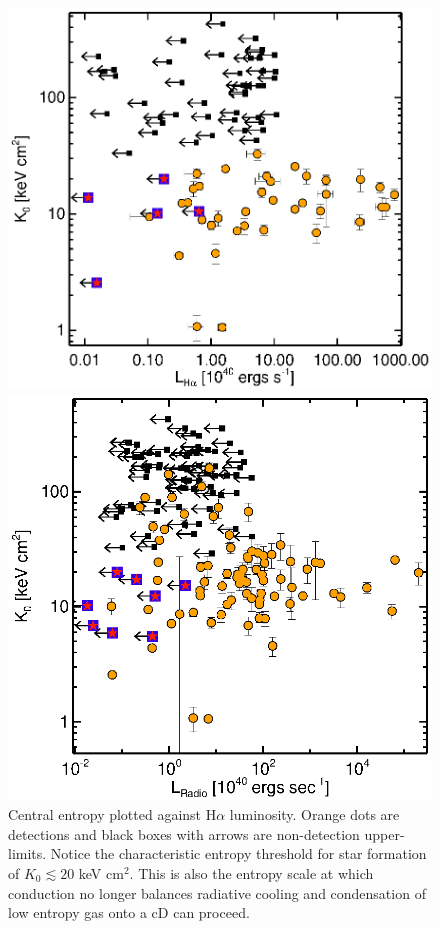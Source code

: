 \documentclass[11pt]{article}
\begin{document}
\clearpage
\begin{figure}[t]
    \hspace{0.1cm}
    \begin{minipage}[t]{0.5\linewidth}
        \centering
        \includegraphics*[width=\textwidth, trim=28mm 8mm 30mm 10mm, clip]{ha_k0}
        \caption{\small Central entropy plotted against H$\alpha$
	luminosity. Orange dots are detections and black boxes with
	arrows are non-detection upper-limits. Notice the characteristic entropy threshold for star
	formation of $K_0 \lesssim 20$ keV cm$^2$. This is also the entropy scale at
	which conduction no longer balances radiative cooling and condensation
	of low entropy gas onto a cD can proceed.}
        \label{fig:ha}
    \end{minipage}
    \hspace{0.1in}
    \begin{minipage}[t]{0.5\linewidth}
        \centering
        \includegraphics*[width=\textwidth, trim=28mm 8mm 30mm 10mm, clip]{k0rad}

\end{minipage}
\end{figure}
\end{document}
